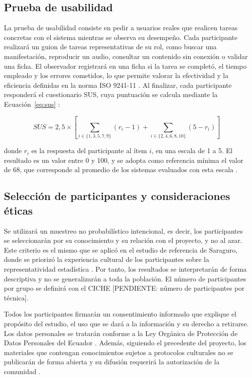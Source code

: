 \subsection{Prueba de usabilidad}
La prueba de usabilidad consiste en pedir a usuarios reales que realicen tareas concretas con el sistema mientras se observa su desempeño. Cada participante realizará un guion de tareas representativas de su rol, como buscar una manifestación, reproducir un audio, consultar un contenido sin conexión o validar una ficha. El observador registrará en una ficha si la tarea se completó, el tiempo empleado y los errores cometidos, lo que permite valorar la efectividad y la eficiencia definidas en la norma ISO 9241-11 \cite{iso2018usability}. Al finalizar, cada participante responderá el cuestionario SUS, cuya puntuación se calcula mediante la Ecuación~\ref{eq:sus} \cite{brooke1996sus}:

\begin{equation}
\label{eq:sus}
SUS = 2{,}5 \times \left[ \sum_{i \in \{1,3,5,7,9\}} (r_i - 1) + \sum_{i \in \{2,4,6,8,10\}} (5 - r_i) \right]
\end{equation}

\noindent donde $r_i$ es la respuesta del participante al ítem $i$, en una escala de 1 a 5. El resultado es un valor entre 0 y 100, y se adopta como referencia mínima el valor de 68, que corresponde al promedio de los sistemas evaluados con esta escala \cite{sauro2011sus}.

\subsection{Selección de participantes y consideraciones éticas}
Se utilizará un muestreo no probabilístico intencional, es decir, los participantes se seleccionarán por su conocimiento y su relación con el proyecto, y no al azar. Este criterio es el mismo que se aplicó en el estudio de referencia de Saraguro, donde se priorizó la experiencia cultural de los participantes sobre la representatividad estadística \cite{quezada2026culinary}. Por tanto, los resultados se interpretarán de forma descriptiva y no se generalizarán a toda la población. El número de participantes por grupo se definirá con el CICHE [PENDIENTE: número de participantes por técnica].

Todos los participantes firmarán un consentimiento informado que explique el propósito del estudio, el uso que se dará a la información y su derecho a retirarse. Los datos personales se tratarán conforme a la Ley Orgánica de Protección de Datos Personales del Ecuador \cite{ecuador2021lopdp}. Además, siguiendo el precedente del proyecto, los materiales que contengan conocimientos sujetos a protocolos culturales no se publicarán de forma abierta y su difusión requerirá la autorización de la comunidad \cite{quezada2026culinary,unesco2015ethical}.

